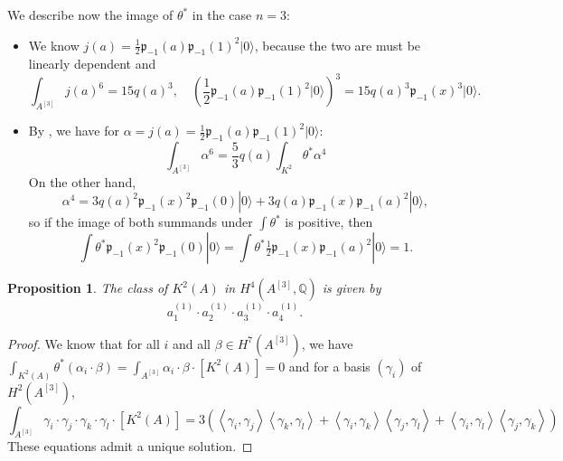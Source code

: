 \documentclass{amsart}
\newcommand{\hilb}[1]{^{[#1]}}
\newcommand{\vac}{|0\rangle}
\newcommand{\p}{\mathfrak{p}}
\newcommand{\pone}{ \mathfrak{p}_{ - 1} }
\newcommand{\Q}{\mathbb{Q}}
\theoremstyle{plain}
\newtheorem{proposition}[theorem]{Proposition}
\theoremstyle{definition}
\theoremstyle{remark}
\begin{document}
We describe now the image of $\theta^*$ in the case $n=3$:
\begin{itemize}
\item We know $j(a)=\frac{1}{2}\p_{-1}(a)\p_{-1}(1)^2\vac$, because the two are must be linearly dependent and
$$ \int_{A\hilb{3}}j(a)^6 = 15 q(a)^3, \quad \left(\frac{1}{2}\p_{-1}(a)\p_{-1}(1)^2\vac\right)^3 = 15 q(a)^3\p_{-1}(x)^3\vac.
$$
\item By \cite[p. 8]{Britze}, we have for $\alpha = j(a)=\frac{1}{2}\p_{-1}(a)\p_{-1}(1)^2\vac$: 
$$ \int_{A\hilb{3}}\alpha^6 = \frac{5}{3} q(a) \int_{K^2} \theta^* \alpha^4
$$
On the other hand, 
$$\alpha^4 = 3 q(a)^2\p_{-1}(x)^2\p_{-1}(0)\vac + 3q(a) \p_{-1}(x) \p_{-1}(a)^2\vac,$$
so if the image of both summands under $\int\theta^*$ is positive, then 
$$ \int\theta^*\p_{-1}(x)^2\p_{-1}(0)\vac = \int\theta^* \tfrac{1}{2}\p_{-1}(x) \p_{-1}(a)^2\vac=1 .$$ 

\end{itemize}
\begin{proposition}
The class of $K^2(A)$ in $H^4(A\hilb{3},\Q)$ is given by
$$
a_1^{(1)}\cdot a_2^{(1)}\cdot a_3^{(1)}\cdot a_4^{(1)}.
$$ 
\end{proposition}
\begin{proof}
We know that for all $i$ and all $\beta\in H^7(A\hilb{3})$, we have $\int_ {K^2(A)}\theta^*(\alpha_i\cdot\beta) = \int_ {A\hilb{3}}\alpha_i\cdot\beta \cdot[K^2(A)]= 0$ and
for a basis $(\gamma_i) $ of  $H^2(A\hilb{3})$,
$$
\int_ {A\hilb{3}}\gamma_i\cdot\gamma_j\cdot\gamma_k\cdot\gamma_l\cdot[K^2(A)] =
 3\left(\left<\gamma_i,\gamma_j\right>\left<\gamma_k,\gamma_l\right>+\left<\gamma_i,\gamma_k\right>\left<\gamma_j,\gamma_l\right>+\left<\gamma_i,\gamma_l\right>\left<\gamma_j,\gamma_k\right>  \right)
$$
These equations admit a unique solution.
\end{proof}
\end{document}
